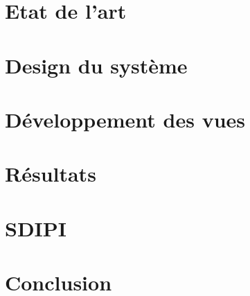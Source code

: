 \chapter{Etat de l'art}

\chapter{Design du système}

\chapter{Développement des vues}

\chapter{Résultats}

\chapter{SDIPI}

\chapter{Conclusion}


